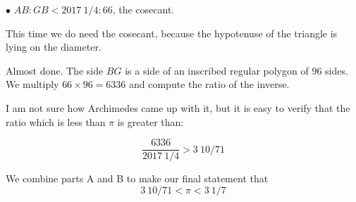 \documentclass[11pt, oneside]{article}
\begin{document}
$\bullet$ $AB:GB < 2017 \ 1/4:66$, the cosecant.

This time we do need the cosecant, because the hypotenuse of the triangle is lying on the diameter.

Almost done.  The side $BG$ is a side of an inscribed regular polygon of $96$ sides.  We multiply $66 \times 96 = 6336$ and compute the ratio of the inverse.  

I am not sure how Archimedes came up with it, but it is easy to verify that the ratio which is less than $\pi$ is greater than:

\[ \frac{6336}{2017 \ 1/4} > 3 \ 10/71 \]

We combine parts A and B to make our final statement that
\[ 3 \ 10/71 < \pi < 3 \ 1/7 \]
\end{document}
